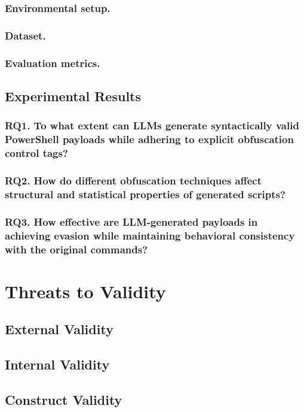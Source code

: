\documentclass[runningheads]{llncs}
\begin{document}
\subsubsection{Environmental setup.}

\subsubsection{Dataset.}

\subsubsection{Evaluation metrics.}


\subsection{Experimental Results}
\subsubsection{RQ1. To what extent can LLMs generate syntactically valid PowerShell payloads while adhering to explicit obfuscation control tags?}


\subsubsection{RQ2. How do different obfuscation techniques affect structural and statistical properties of generated scripts?}


\subsubsection{RQ3. How effective are LLM-generated payloads in achieving evasion while maintaining behavioral consistency with the original commands?}


\section{Threats to Validity}
\subsection{External Validity}


\subsection{Internal Validity}


\subsection{Construct Validity}
\end{document}
